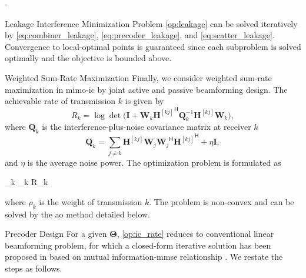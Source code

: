 \begin{section}{-}
\begin{subsection}{Leakage Interference Minimization}
		Problem \eqref{op:leakage} can be solved iteratively by \eqref{eq:combiner_leakage}, \eqref{eq:precoder_leakage}, and \eqref{eq:scatter_leakage}.
		Convergence to local-optimal points is guaranteed since each subproblem is solved optimally and the objective is bounded above.

	\end{subsection}

	\begin{subsection}{Weighted Sum-Rate Maximization}
		Finally, we consider weighted sum-rate maximization in \gls{mimo}-\gls{ic} by joint active and passive beamforming design.
		The achievable rate of transmission $k$ is given by
		\begin{equation}
			R_k = \log \det \biggl(\mathbf{I} + \mathbf{W}_k {\mathbf{H}^{[kj]}}^\mathsf{H} \mathbf{Q}_k^{-1} {\mathbf{H}^{[kj]}} \mathbf{W}_k\biggr),
		\end{equation}
		where $\mathbf{Q}_k$ is the interference-plus-noise covariance matrix at receiver $k$
		\begin{equation}
			\mathbf{Q}_k = \sum_{j \ne k} {\mathbf{H}^{[kj]}} \mathbf{W}_j {\mathbf{W}_j}^\mathsf{H} {\mathbf{H}^{[kj]}}^\mathsf{H} + \eta \mathbf{I},
		\end{equation}
		and $\eta$ is the average noise power.
		The optimization problem is formulated as
		\begin{maxi!}
			{}{\sum_k \rho_k R_k}{\label{op:ic_rate}}{\label{ob:ic_rate}}
		\end{maxi!}
		where $\rho_k$ is the weight of transmission $k$.
		The problem is non-convex and can be solved by the \gls{ao} method detailed below.

		\begin{subsubsection}{Precoder Design}
			For a given $\mathbf{\Theta}$, \eqref{op:ic_rate} reduces to conventional linear beamforming problem, for which a closed-form iterative solution has been proposed in \cite{Negro2010} based on mutual information-\gls{mmse} relationship \cite{Guo2005}.
			We restate the steps as follows.


\end{subsubsection}
\end{subsection}
\end{section}
